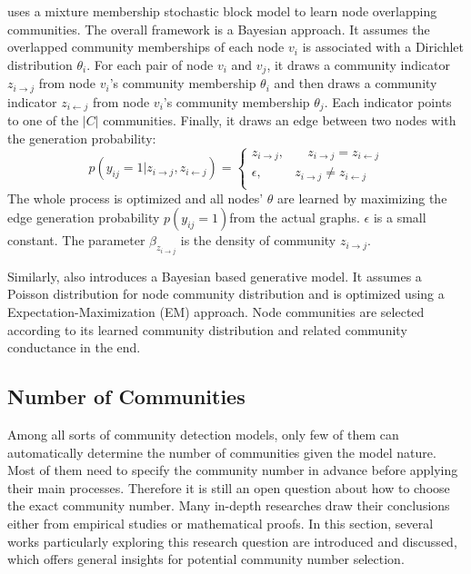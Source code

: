 \cite{gopalan2013efficient} uses a mixture membership stochastic block model to learn node overlapping communities. The overall framework is a Bayesian approach. It assumes the overlapped community memberships of each node $v_i$ is associated with a Dirichlet distribution $\theta_i$. For each pair of node $v_i$ and $v_j$, it draws a community indicator $z_{i \rightarrow j}$ from node $v_i$’s community membership $\theta_i$ and then draws  a community indicator  $z_{i \leftarrow j}$  from node $v_i$’s community membership $\theta_j$. Each indicator points to one
of the $|C|$ communities. Finally, it draws an edge between two nodes with the generation probability:
\begin{equation} 
p(y_{ij} = 1|z_{i \rightarrow j},z_{i \leftarrow j}) =
\begin{cases}
z_{i \rightarrow j},       & \quad  z_{i \rightarrow j} = z_{i \leftarrow j}\\ 
\epsilon,  & z_{i \rightarrow j} \neq z_{i \leftarrow j}\\ 
\end{cases}
\end{equation}
The whole process is optimized and all nodes' $\theta$ are learned by maximizing the edge generation probability $p(y_{ij} = 1)$from the actual graphs.  $\epsilon$ is a small constant. The
parameter $\beta_{z_{i \rightarrow j}}$ is the density of community $z_{i \rightarrow j}$.

Similarly, \cite{jin2016detect} also introduces a Bayesian based generative model. It assumes a Poisson distribution for node community distribution and is optimized using a Expectation-Maximization (EM) approach. Node communities are selected according to its learned community distribution and related community conductance in the end.

\subsection{Number of Communities}
Among all sorts of community detection models, only few of them can automatically determine the number of communities given the model nature. Most of them need to specify the community number in advance before applying their main processes. Therefore it is still an open question about how to choose the exact community number. Many in-depth researches draw their conclusions either from empirical studies or mathematical proofs. In this section, several works particularly exploring this research question are introduced and discussed, which offers general insights for potential community number selection.

